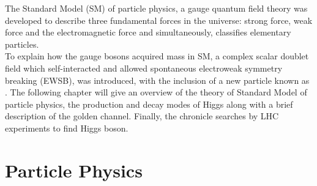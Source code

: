The Standard Model (SM) of particle physics, a gauge quantum field theory was developed to describe three fundamental forces in the universe: strong force, weak force and the electromagnetic force and simultaneously, classifies elementary particles.\\
To explain how the gauge bosons acquired mass in SM, a complex scalar doublet field which self-interacted and allowed spontaneous electroweak symmetry breaking (EWSB), was introduced, with the inclusion of a new particle known as . The following chapter will give an overview of the theory of Standard Model of particle physics, the production and decay modes of Higgs along with a brief description of the golden channel. Finally, the chronicle searches by LHC experiments to find Higgs boson.

\section{Particle Physics}
